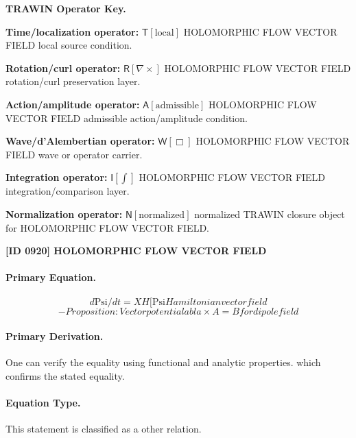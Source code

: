 \par\vspace{0.45\baselineskip}
\noindent\begin{minipage}[t]{\linewidth}
\begingroup
\small
\raggedright
\textbf{TRAWIN Operator Key.}\par
\noindent\textbf{Time/localization operator:} $\mathsf{T}\!\left[\mathrm{local}\right]$ HOLOMORPHIC FLOW VECTOR FIELD local source condition.\par
\noindent\textbf{Rotation/curl operator:} $\mathsf{R}\!\left[\nabla\times\right]$ HOLOMORPHIC FLOW VECTOR FIELD rotation/curl preservation layer.\par
\noindent\textbf{Action/amplitude operator:} $\mathsf{A}\!\left[\mathrm{admissible}\right]$ HOLOMORPHIC FLOW VECTOR FIELD admissible action/amplitude condition.\par
\noindent\textbf{Wave/d'Alembertian operator:} $\mathsf{W}\!\left[\Box\right]$ HOLOMORPHIC FLOW VECTOR FIELD wave or operator carrier.\par
\noindent\textbf{Integration operator:} $\mathsf{I}\!\left[\int\right]$ HOLOMORPHIC FLOW VECTOR FIELD integration/comparison layer.\par
\noindent\textbf{Normalization operator:} $\mathsf{N}\!\left[\mathrm{normalized}\right]$ normalized TRAWIN closure object for HOLOMORPHIC FLOW VECTOR FIELD.\par
\endgroup
\end{minipage}

\clearpage
\noindent\textbf{[ID 0920] HOLOMORPHIC FLOW VECTOR FIELD}\par
\vspace{0.35em}
\paragraph{Primary Equation.}
\[
d\mathrm{Psi}/dt = XH[\mathrm{Psi} Hamiltonian vector field
\]
\[
- Proposition: Vector potential  abla\times A = B for dipole field
\]

\paragraph{Primary Derivation.}
One can verify the equality using functional and analytic properties. which confirms the stated equality.
\paragraph{Equation Type.}
This statement is classified as a other relation.


